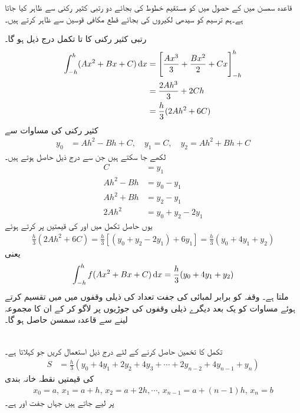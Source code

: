 قاعدہ سمسن میں  کے حصول میں  کو مستقیم خطوط کی بجائے دو رتبی کثیر رکنی سے ظاہر کیا جاتا ہے۔ہم ترسیم کو سیدھی لکیروں کی بجائے قطع مکافی قوسین سے ظاہر کرتے ہیں۔ 

رتبی کثیر رکنی  کا  تا  تکمل درج ذیل ہو گا۔
\begin{align*}
\int_{-h}^h(Ax^2+Bx+C)\dif x&=\left[\frac{Ax^3}{3}+\frac{Bx^2}{2}+Cx\right]_{-h}^h\\
&=\frac{2Ah^3}{3}+2Ch\\
&=\frac{h}{3}(2Ah^2+6C)
\end{align*}
کثیر رکنی کی مساوات سے 
\begin{align*}
y_0&=Ah^2-Bh+C,\quad y_1=C,\quad y_2=Ah^2+Bh+C
\end{align*}
لکھے جا سکتے ہیں جن سے درج ذیل حاصل ہوتے ہیں۔
\begin{align*}
C&=y_1\\
Ah^2-Bh&=y_0-y_1\\
Ah^2+Bh&=y_2-y_1\\
2Ah^2&=y_0+y_2-2y_1
\end{align*}
یوں حاصل تکمل میں  اور  کی قیمتیں پر کرتے ہوئے
\begin{align*}
\frac{h}{3}(2Ah^2+6C)=\frac{h}{3}[(y_0+y_2-2y_1)+6y_1]=\frac{h}{3}(y_0+4y_1+y_2)
\end{align*}
یعنی
\begin{align}\label{مساوات_تکمل_قاعدہ_سمسن_الف}
\int_{-h}^hf(Ax^2+Bx+C)\dif x=\frac{h}{3}(y_0+4y_1+y_2)
\end{align}
ملتا ہے۔ وقفہ  کو برابر لمبائی کی جفت تعداد کی ذیلی وقفوں میں میں تقسیم کرتے ہوئے  مساوات  کو یک بعد دیگرے ذیلی وقفوں کی جوڑیوں پر لاگو کر کے ان کا مجموعہ لینے سے  قاعدہ سمسن حاصل ہو گا۔

\\
تکمل  کا تخمین حاصل کرنے کے لئے درج ذیل استعمال کریں جو   کہلاتا ہے۔ 
\begin{align}\label{مساوات_تکمل_قاعدہ_سمسن}
S&=\frac{h}{3}(y_0+4y_1+2y_2+4y_3+\cdots+2y_{n-2}+4y_{n-1}+y_n)
\end{align}
 کی قیمتیں نقطہ خانہ بندی
\begin{align*}
x_0=a,\, x_1=a+h,\, x_2=a+2h, \cdots, \, x_{n-1}=a+(n-1)h,\, x_n=b
\end{align*} 
پر لیے جاتے ہیں جہاں  جفت اور  ہے۔

